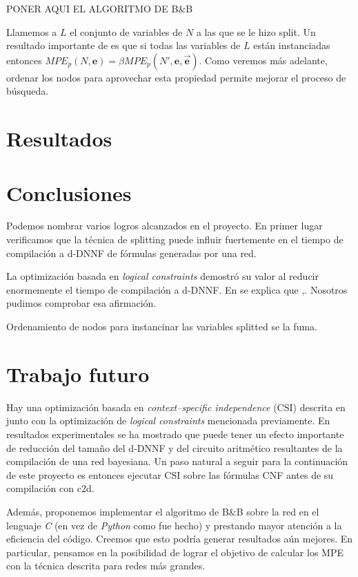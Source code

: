 \documentclass[11pt, letterpaper]{article}
\begin{document}
PONER AQUI EL ALGORITMO DE B\&B

Llamemos a $L$ el conjunto de variables de $N$ a las que se le hizo
split. Un resultado importante de \cite{ChoiChaviraDarwiche07} es que
si todas las variables de $L$ están instanciadas entonces $MPE_p(N,
\mathbf{e}) = \beta MPE_p(N', \mathbf{e}, \vec{\mathbf{e}})$. Como veremos
más adelante, ordenar los nodos para aprovechar esta propiedad permite
mejorar el proceso de búsqueda.

\section{Resultados}

\section{Conclusiones}

Podemos nombrar varios logros alcanzados en el proyecto. En primer lugar
verificamos que la técnica de splitting puede influir fuertemente en el tiempo
de compilación a d-DNNF de fórmulas generadas por una red.

La optimización basada en \emph{logical constraints} demostró su valor al
reducir enormemente el tiempo de compilación a d-DNNF. En
\cite{Darwiche01alogical} se explica que ,. Nosotros pudimos comprobar esa
afirmación.

Ordenamiento de nodos para instancinar las variables splitted se la fuma.

\section{Trabajo futuro}

Hay una optimización basada en \emph{context–specific independence} (CSI)
descrita en
\cite{Darwiche01alogical} junto con la optimización de \emph{logical constraints}
mencionada previamente. En resultados experimentales se ha mostrado que puede
tener un efecto importante de reducción del tamaño del d-DNNF y del circuito
aritmético resultantes de la compilación de una red bayesiana. Un paso natural a
seguir para la continuación de este proyecto es entonces ejecutar CSI sobre las
fórmulas CNF antes de su compilación con c2d.

Además, proponemos implementar el algoritmo de B\&B sobre la red en el
lenguaje \emph{C} (en vez de \emph{Python} como fue hecho) y prestando mayor
atención a la eficiencia del código. Creemos
que esto podría generar resultados aún mejores. En particular, pensamos en la
posibilidad de lograr el objetivo de calcular los MPE con la técnica descrita
para redes más grandes.



\end{document}
